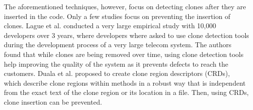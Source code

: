 The aforementioned  techniques, however, focus on detecting clones after they are inserted in the code. Only a few studies focus on preventing the insertion of clones. Lague et al. \cite{Lague} conducted a very large empirical study with 10,000 developers over 3 years, where developers where asked to use clone detection tools during the development process of a very large telecom system. The authors found that while clones are being removed over time, using clone detection tools help improving the quality of the system as it prevents defects to reach the customers. Duala et al. \cite{Duala-Ekoko2007,Duala-Ekoko2010} proposed to create clone region descriptors (CRDs), which describe clone regions within methods in a robust way that is independent from the exact text of the clone region or its location in a file. Then, using CRDs, clone insertion can be prevented.
